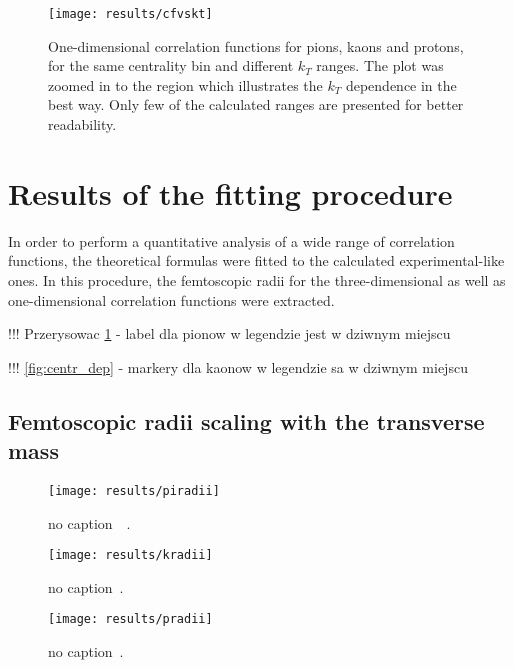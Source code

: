       \begin{figure}[h]
        \centering
        \centerline{\texttt{[image: results/cfvskt]}}
        \caption{One-dimensional correlation functions for pions, kaons and protons, for the same centrality bin and different $k_T$ ranges. The plot was zoomed in to the region which illustrates the $k_T$ dependence in the best way. Only few of the calculated ranges are presented for better readability.}
      \label{fig:kt_dep}
      \end{figure}
    \FloatBarrier
    \clearpage
  \section{Results of the fitting procedure}
  In order to perform a quantitative analysis of a wide range of correlation functions, the theoretical formulas were fitted to the calculated experimental-like ones.
  In this procedure, the femtoscopic radii for the three-dimensional as well as one-dimensional correlation functions were extracted.


  !!! Przerysowac \ref{fig:kt_dep} - label dla pionow w legendzie jest w dziwnym miejscu

  !!! \ref{fig:centr_dep} - markery dla kaonow w legendzie sa w dziwnym miejscu

    \subsection{Femtoscopic radii scaling with the transverse mass}
      \begin{figure}[h]
        \centering
        \centerline{\texttt{[image: results/piradii]}}
        \caption{no caption~\cite{alice_pion}~\cite{galazyn}.}
      \label{fig:piradii}
      \end{figure}



      \begin{figure}[h]
        \centering
        \centerline{\texttt{[image: results/kradii]}}
        \caption{no caption~\cite{galazyn}.}
      \label{fig:kradii}
      \end{figure}



      \begin{figure}[h]
        \centering
        \centerline{\texttt{[image: results/pradii]}}
        \caption{no caption~\cite{galazyn}.}
      \label{fig:pradii}
      \end{figure}    

